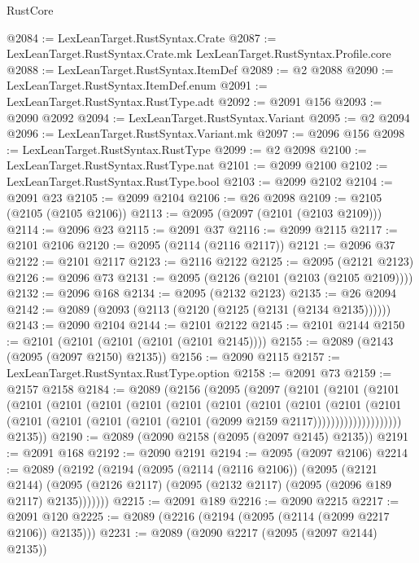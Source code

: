 \begin{lexlean}{RustCore}
\begin{coremodule}
@2084 := LexLeanTarget.RustSyntax.Crate
@2087 := LexLeanTarget.RustSyntax.Crate.mk LexLeanTarget.RustSyntax.Profile.core
@2088 := LexLeanTarget.RustSyntax.ItemDef
@2089 := @2 @2088
@2090 := LexLeanTarget.RustSyntax.ItemDef.enum
@2091 := LexLeanTarget.RustSyntax.RustType.adt
@2092 := @2091 @156
@2093 := @2090 @2092
@2094 := LexLeanTarget.RustSyntax.Variant
@2095 := @2 @2094
@2096 := LexLeanTarget.RustSyntax.Variant.mk
@2097 := @2096 @156
@2098 := LexLeanTarget.RustSyntax.RustType
@2099 := @2 @2098
@2100 := LexLeanTarget.RustSyntax.RustType.nat
@2101 := @2099 @2100
@2102 := LexLeanTarget.RustSyntax.RustType.bool
@2103 := @2099 @2102
@2104 := @2091 @23
@2105 := @2099 @2104
@2106 := @26 @2098
@2109 := @2105 (@2105 (@2105 @2106))
@2113 := @2095 (@2097 (@2101 (@2103 @2109)))
@2114 := @2096 @23
@2115 := @2091 @37
@2116 := @2099 @2115
@2117 := @2101 @2106
@2120 := @2095 (@2114 (@2116 @2117))
@2121 := @2096 @37
@2122 := @2101 @2117
@2123 := @2116 @2122
@2125 := @2095 (@2121 @2123)
@2126 := @2096 @73
@2131 := @2095 (@2126 (@2101 (@2103 (@2105 @2109))))
@2132 := @2096 @168
@2134 := @2095 (@2132 @2123)
@2135 := @26 @2094
@2142 := @2089 (@2093 (@2113 (@2120 (@2125 (@2131 (@2134 @2135))))))
@2143 := @2090 @2104
@2144 := @2101 @2122
@2145 := @2101 @2144
@2150 := @2101 (@2101 (@2101 (@2101 (@2101 @2145))))
@2155 := @2089 (@2143 (@2095 (@2097 @2150) @2135))
@2156 := @2090 @2115
@2157 := LexLeanTarget.RustSyntax.RustType.option
@2158 := @2091 @73
@2159 := @2157 @2158
@2184 := @2089
    (@2156
      (@2095
        (@2097
          (@2101
            (@2101
              (@2101
                (@2101
                  (@2101
                    (@2101
                      (@2101
                        (@2101
                          (@2101
                            (@2101
                              (@2101
                                (@2101
                                  (@2101
                                    (@2101
                                      (@2101
                                        (@2101 (@2101 (@2101 (@2099 @2159 @2117))))))))))))))))))))
        @2135))
@2190 := @2089 (@2090 @2158 (@2095 (@2097 @2145) @2135))
@2191 := @2091 @168
@2192 := @2090 @2191
@2194 := @2095 (@2097 @2106)
@2214 := @2089
    (@2192
      (@2194
        (@2095
          (@2114 (@2116 @2106))
          (@2095
            (@2121 @2144)
            (@2095 (@2126 @2117) (@2095 (@2132 @2117) (@2095 (@2096 @189 @2117) @2135)))))))
@2215 := @2091 @189
@2216 := @2090 @2215
@2217 := @2091 @120
@2225 := @2089 (@2216 (@2194 (@2095 (@2114 (@2099 @2217 @2106)) @2135)))
@2231 := @2089 (@2090 @2217 (@2095 (@2097 @2144) @2135))

\end{coremodule}
\end{lexlean}
